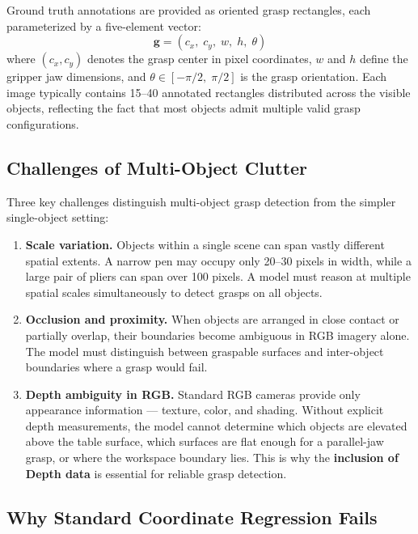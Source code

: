 \documentclass[12pt, a4paper]{article}
\begin{document}
Ground truth annotations are provided as oriented grasp rectangles, each parameterized by a five-element vector:
\begin{equation}
    \mathbf{g} = (c_x,\; c_y,\; w,\; h,\; \theta)
\end{equation}
where $(c_x, c_y)$ denotes the grasp center in pixel coordinates, $w$ and $h$ define the gripper jaw dimensions, and $\theta \in [-\pi/2,\; \pi/2]$ is the grasp orientation. Each image typically contains 15--40 annotated rectangles distributed across the visible objects, reflecting the fact that most objects admit multiple valid grasp configurations.

\subsection{Challenges of Multi-Object Clutter}

Three key challenges distinguish multi-object grasp detection from the simpler single-object setting:

\begin{enumerate}[leftmargin=2em]
    \item \textbf{Scale variation.} Objects within a single scene can span vastly different spatial extents. A narrow pen may occupy only 20--30 pixels in width, while a large pair of pliers can span over 100 pixels. A model must reason at multiple spatial scales simultaneously to detect grasps on all objects.

    \item \textbf{Occlusion and proximity.} When objects are arranged in close contact or partially overlap, their boundaries become ambiguous in RGB imagery alone. The model must distinguish between graspable surfaces and inter-object boundaries where a grasp would fail.

    \item \textbf{Depth ambiguity in RGB.} Standard RGB cameras provide only appearance information — texture, color, and shading. Without explicit depth measurements, the model cannot determine which objects are elevated above the table surface, which surfaces are flat enough for a parallel-jaw grasp, or where the workspace boundary lies. This is why the \textbf{inclusion of Depth data} is essential for reliable grasp detection.
\end{enumerate}

\subsection{Why Standard Coordinate Regression Fails}
\end{document}
